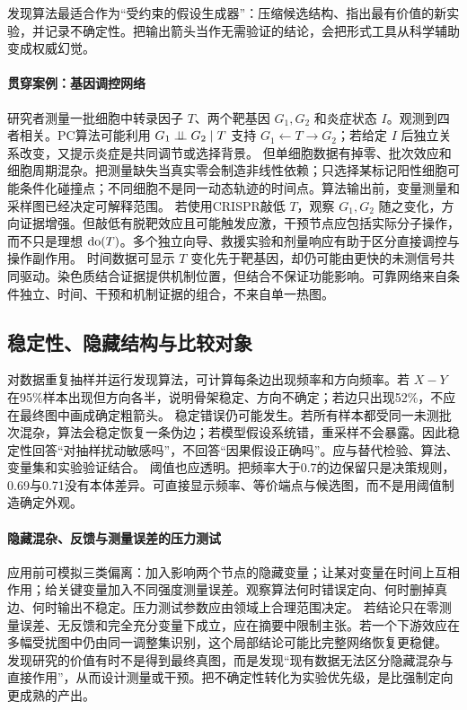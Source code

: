 发现算法最适合作为“受约束的假设生成器”：压缩候选结构、指出最有价值的新实验，并记录不确定性。把输出箭头当作无需验证的结论，会把形式工具从科学辅助变成权威幻觉。

\paragraph{贯穿案例：基因调控网络}

研究者测量一批细胞中转录因子 $T$、两个靶基因 $G_1,G_2$ 和炎症状态 $I$。观测到四者相关。PC算法可能利用 $G_1\mathrel{\perp\!\!\!\perp} G_2\mid T$ 支持 $G_1\leftarrow T\rightarrow G_2$；若给定 $I$ 后独立关系改变，又提示炎症是共同调节或选择背景。
但单细胞数据有掉零、批次效应和细胞周期混杂。把测量缺失当真实零会制造非线性依赖；只选择某标记阳性细胞可能条件化碰撞点；不同细胞不是同一动态轨迹的时间点。算法输出前，变量测量和采样图已经决定可解释范围。
若使用CRISPR敲低 $T$，观察 $G_1,G_2$ 随之变化，方向证据增强。但敲低有脱靶效应且可能触发应激，干预节点应包括实际分子操作，而不只是理想 $\operatorname{do}(T)$。多个独立向导、救援实验和剂量响应有助于区分直接调控与操作副作用。
时间数据可显示 $T$ 变化先于靶基因，却仍可能由更快的未测信号共同驱动。染色质结合证据提供机制位置，但结合不保证功能影响。可靠网络来自条件独立、时间、干预和机制证据的组合，不来自单一热图。

\subsection{稳定性、隐藏结构与比较对象}

对数据重复抽样并运行发现算法，可计算每条边出现频率和方向频率。若 $X-Y$ 在95\%样本出现但方向各半，说明骨架稳定、方向不确定；若边只出现52\%，不应在最终图中画成确定粗箭头。
稳定错误仍可能发生。若所有样本都受同一未测批次混杂，算法会稳定恢复一条伪边；若模型假设系统错，重采样不会暴露。因此稳定性回答“对抽样扰动敏感吗”，不回答“因果假设正确吗”。应与替代检验、算法、变量集和实验验证结合。
阈值也应透明。把频率大于0.7的边保留只是决策规则，0.69与0.71没有本体差异。可直接显示频率、等价端点与候选图，而不是用阈值制造确定外观。

\paragraph{隐藏混杂、反馈与测量误差的压力测试}

应用前可模拟三类偏离：加入影响两个节点的隐藏变量；让某对变量在时间上互相作用；给关键变量加入不同强度测量误差。观察算法何时错误定向、何时删掉真边、何时输出不稳定。压力测试参数应由领域上合理范围决定。
若结论只在零测量误差、无反馈和完全充分变量下成立，应在摘要中限制主张。若一个下游效应在多幅受扰图中仍由同一调整集识别，这个局部结论可能比完整网络恢复更稳健。
发现研究的价值有时不是得到最终真图，而是发现“现有数据无法区分隐藏混杂与直接作用”，从而设计测量或干预。把不确定性转化为实验优先级，是比强制定向更成熟的产出。

